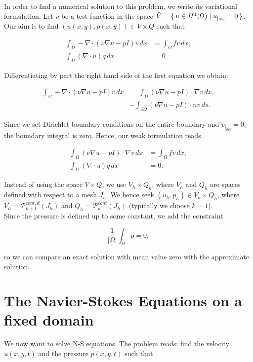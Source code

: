 \documentclass[11pt,a4paper,titlepage]{report}
\begin{document}
In order to find a numerical solution to this problem, we write its variational formulation. Let $v$ be a test function in the space $\hat{V} = \set{u \in H^1(\Omega) | u_{|_{\partial \Omega}} = 0} $. Our aim is to find $(u(x,y),p(x,y)) \in V \times Q$ such that

\begin{align}
\int_\Omega -\nabla \cdot (\nu \nabla u - pI)v \,dx &= \int_\Omega fv \,dx, \\
\int_\Omega (\nabla \cdot u)q \,dx &= 0
\end{align}

Differentiating by part the right hand side of the first equation we obtain:

\begin{align}
\int_\Omega -\nabla \cdot (\nu \nabla u - pI)v \,dx &= \int_\Omega (\nu \nabla u - pI) \cdot \nabla v \,dx, \\
&- \int_{\partial \Omega} (\nu \nabla u - pI) \cdot n v \,ds.
\end{align}

Since we set Dirichlet boundary conditions on the entire boundary and $v_{|_{\partial \Omega}} = 0$, the boundary integral is zero. Hence, our weak formulation reads

\begin{align}
\int_\Omega (\nu \nabla u - pI) \cdot \nabla v \,dx &= \int_\Omega fv \,dx, \\
\int_\Omega (\nabla \cdot u) q \,dx &= 0.
\end{align}

Instead of using the space $V \times Q$, we use $V_h \times Q_h$, where $V_h$ and $Q_h$ are spaces defined with respect to a mesh $J_h$. We hence seek $(u_h, p_h) \in V_h \times Q_h$, where $V_h = \mathcal{P}^{cont,d}_{k+1} (J_h)$ and $Q_h = \mathcal{P}^{cont}_{k} (J_h)$ (typically we choose $k=1$). \\


Since the pressure is defined up to some constant, we add the constraint 

\[
\frac{1}{|\Omega |} \int_{\Omega} p = 0,
\]

so we can compare an exact solution with mean value zero with the approximate solution. 

\section{The Navier-Stokes Equations on a fixed domain}
We now want to solve N-S equations. The problem reads: find the velocity $u(x,y,t)$ and the pressure $p(x,y,t)$ such that
\end{document}
